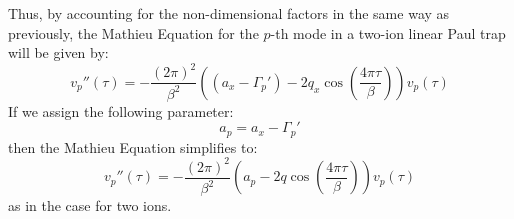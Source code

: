 \documentclass{article}
\begin{document}
Thus, by accounting for the non-dimensional factors in the same way as previously, the Mathieu Equation for the $p$-th mode in a two-ion linear Paul trap will be given by: 
\begin{equation}
	v_p '' (\tau) = - \frac{(2 \pi)^2}{\beta^2} \left( \left( a_x - \Gamma_p' \right) - 2 q_x \cos (\frac{4 \pi \tau}{\beta}) \right)	v_p (\tau)
\end{equation}
If we assign the following parameter:
\begin{equation}
a_p = a_x - \Gamma_p'
\end{equation}
then the Mathieu Equation simplifies to:
\begin{equation}
v_p '' (\tau) = - \frac{(2 \pi)^2}{\beta^2} \left( a_p - 2 q \cos \left( \frac{4 \pi \tau}{\beta} \right) \right)	 v_p (\tau)
\end{equation}
as in the case for two ions. 
\end{document}
